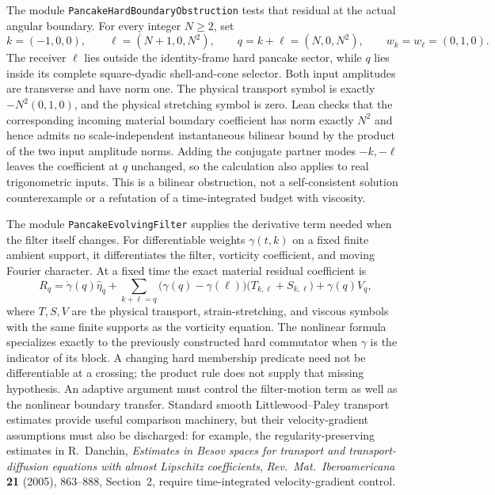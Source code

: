 \documentclass[11pt]{article}
\theoremstyle{definition}
\begin{document}
The module \texttt{PancakeHardBoundaryObstruction} tests that residual at
the actual angular boundary.  For every integer $N\geq2$, set
\[
 k=(-1,0,0),\qquad \ell=(N+1,0,N^2),\qquad q=k+\ell=(N,0,N^2),
 \qquad w_k=w_\ell=(0,1,0).
\]
The receiver $\ell$ lies outside the identity-frame hard pancake sector,
while $q$ lies inside its complete square-dyadic shell-and-cone selector.
Both input amplitudes are transverse and have norm one.  The physical
transport symbol is exactly $-N^2(0,1,0)$, and the physical stretching
symbol is zero.  Lean checks that the corresponding incoming material
boundary coefficient has norm exactly $N^2$ and hence admits no
scale-independent instantaneous bilinear bound by the product of the two
input amplitude norms.  Adding the conjugate partner modes $-k,-\ell$
leaves the coefficient at $q$ unchanged, so the calculation also applies
to real trigonometric inputs.  This is a bilinear obstruction, not a
self-consistent solution counterexample or a refutation of a
time-integrated budget with viscosity.

The module \texttt{PancakeEvolvingFilter} supplies the derivative term needed
when the filter itself changes.  For differentiable weights $\gamma(t,k)$
on a fixed finite ambient support, it differentiates the filter, vorticity
coefficient, and moving Fourier character.  At a fixed time the exact
material residual coefficient is
\[
 R_q=\dot\gamma(q)\widehat\eta_q
   +\sum_{k+\ell=q}\bigl(\gamma(q)-\gamma(\ell)\bigr)
       \bigl(T_{k,\ell}+S_{k,\ell}\bigr)
   +\gamma(q)V_q,
\]
where $T,S,V$ are the physical transport, strain-stretching, and viscous
symbols with the same finite supports as the vorticity equation.  The
nonlinear formula specializes exactly to the previously constructed hard
commutator when $\gamma$ is the indicator of its block.  A changing hard
membership predicate need not be differentiable at a crossing; the product
rule does not supply that missing hypothesis.  An adaptive argument must
control the filter-motion term as well as the nonlinear boundary transfer.
Standard smooth Littlewood--Paley transport estimates provide useful
comparison machinery, but their velocity-gradient assumptions must also be
discharged: for example, the regularity-preserving estimates in
R.~Danchin, \emph{Estimates in Besov spaces for transport and
transport-diffusion equations with almost Lipschitz coefficients},
\emph{Rev.\ Mat.\ Iberoamericana} \textbf{21} (2005), 863--888,
Section~2, require time-integrated velocity-gradient control.
\end{document}
